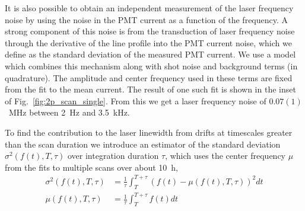 \documentclass[%
 amsmath,amssymb,
aps,
]{revtex4-2}
\begin{document}
It is also possible to obtain an independent measurement of the laser frequency noise by using the noise in the PMT current as a function of the frequency. A strong component of this noise is from the transduction of laser frequency noise through the derivative of the line profile into the PMT current noise, which we define as the standard deviation of the measured PMT current. We use a model which combines this mechanism along with shot noise and background terms (in quadrature). The amplitude and center frequency used in these terms are fixed from the fit to the mean current. The result of one such fit is shown in the inset of Fig.~\ref{fig:2p_scan_single}. From this we get a laser frequency noise of $0.07(1)$~MHz between 2~Hz and 3.5~kHz. 

To find the contribution to the laser linewidth from drifts at timescales greater than the scan duration we introduce an estimator of the standard deviation \(\sigma^{2}(f(t),T,\tau)\) over integration duration $\tau$, which uses the center frequency \(\mu\) from the fits to multiple scans over about 10~h,
\begin{align}
    \sigma^{2}(f(t),T,\tau)&=\frac{1}{\tau}\int_{T}^{T+\tau}   (f(t)-\mu(f(t),T,\tau))^2 dt \\ 
    \mu(f(t),T,\tau)&=\frac{1}{\tau}\int_{T}^{T+\tau}  f(t) dt
\end{align}
\end{document}
